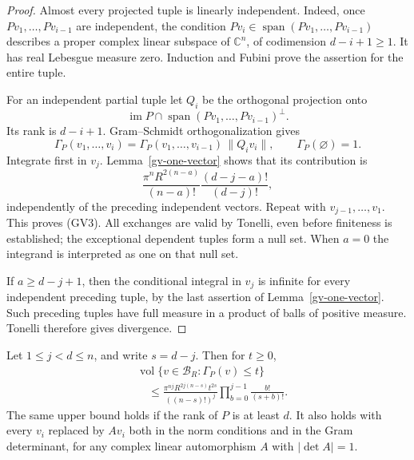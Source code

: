 \begin{proof}
Almost every projected tuple is linearly independent.  Indeed,
once $Pv_1,\ldots,Pv_{i-1}$ are independent, the condition
$Pv_i\in\operatorname{span}(Pv_1,\ldots,Pv_{i-1})$ describes a
proper complex linear subspace of $\mathbb C^n$, of codimension
$d-i+1\ge1$.  It has real Lebesgue measure zero.  Induction
and Fubini prove the assertion for the entire tuple.

For an independent partial tuple let $Q_i$ be the orthogonal
projection onto
\[
 \operatorname{im}P\cap
        \operatorname{span}(Pv_1,\ldots,Pv_{i-1})^\perp.
\]
Its rank is $d-i+1$.  Gram--Schmidt orthogonalization gives
\[
 \Gamma_P(v_1,\ldots,v_i)
   =\Gamma_P(v_1,\ldots,v_{i-1})\,\|Q_iv_i\|,
 \qquad \Gamma_P(\varnothing)=1.                              \tag{GV4}
\]
Integrate first in $v_j$.  Lemma~\ref{gv-one-vector} shows
that its contribution is
\[
 \frac{\pi^nR^{2(n-a)}}{(n-a)!}
       \frac{(d-j-a)!}{(d-j)!},
\]
independently of the preceding independent vectors.  Repeat
with $v_{j-1},\ldots,v_1$.  This proves (GV3).  All exchanges
are valid by Tonelli, even before finiteness is established;
the exceptional dependent tuples form a null set.  When $a=0$
the integrand is interpreted as one on that null set.

If $a\ge d-j+1$, then the conditional integral in $v_j$
is infinite for every independent preceding tuple, by the
last assertion of Lemma~\ref{gv-one-vector}.  Such preceding
tuples have full measure in a product of balls of positive
measure.  Tonelli therefore gives divergence.
\end{proof}

\begin{corollary}\label{gv-sublevel}
Let $1\le j<d\le n$, and write $s=d-j$.  Then for $t\ge0$,
\[
 \begin{split}
 &\operatorname{vol}\{v\in\mathcal B_R:\Gamma_P(v)\le t\}\\
 &\quad\le
  \frac{\pi^{nj}R^{2j(n-s)}t^{2s}}{((n-s)!)^j}
       \prod_{b=0}^{j-1}\frac{b!}{(s+b)!}.                    \end{split}
 \tag{GV5}
\]
The same upper bound holds if the rank of $P$ is at least $d$.
It also holds with every $v_i$ replaced by $Av_i$ both in the
norm conditions and in the Gram determinant, for any complex
linear automorphism $A$ with $|\det A|=1$.
\end{corollary}

